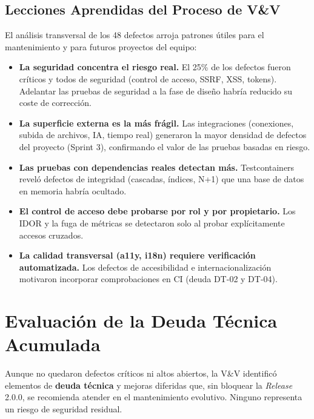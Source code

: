 \subsection{Lecciones Aprendidas del Proceso de V\&V}

El análisis transversal de los 48 defectos arroja patrones útiles para el mantenimiento y
para futuros proyectos del equipo:

\begin{itemize}
    \item \textbf{La seguridad concentra el riesgo real.} El 25\% de los defectos fueron
    críticos y todos de seguridad (control de acceso, SSRF, XSS, tokens). Adelantar las
    pruebas de seguridad a la fase de diseño habría reducido su coste de corrección.
    \item \textbf{La superficie externa es la más frágil.} Las integraciones (conexiones,
    subida de archivos, IA, tiempo real) generaron la mayor densidad de defectos del
    proyecto (Sprint 3), confirmando el valor de las pruebas basadas en riesgo.
    \item \textbf{Las pruebas con dependencias reales detectan más.} Testcontainers reveló
    defectos de integridad (cascadas, índices, N+1) que una base de datos en memoria habría
    ocultado.
    \item \textbf{El control de acceso debe probarse por rol y por propietario.} Los IDOR y
    la fuga de métricas se detectaron solo al probar explícitamente accesos cruzados.
    \item \textbf{La calidad transversal (a11y, i18n) requiere verificación automatizada.}
    Los defectos de accesibilidad e internacionalización motivaron incorporar comprobaciones
    en CI (deuda DT-02 y DT-04).
\end{itemize}

\clearpage
\section{Evaluación de la Deuda Técnica Acumulada}
\label{sec:concl-deuda}

Aunque no quedaron defectos críticos ni altos abiertos, la V\&V identificó elementos de
\textbf{deuda técnica} y mejoras diferidas que, sin bloquear la \textit{Release} 2.0.0, se
recomienda atender en el mantenimiento evolutivo. Ninguno representa un riesgo de seguridad
residual.

